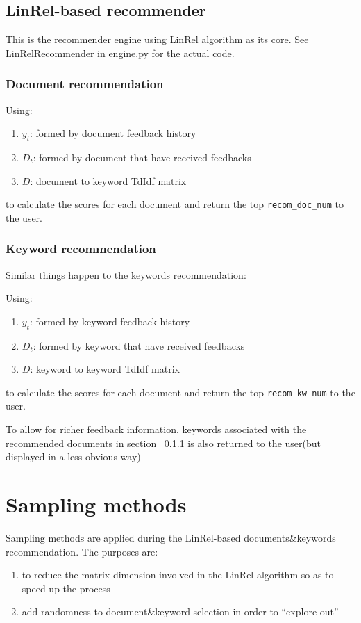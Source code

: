 \documentclass[10pt,a4paper]{article}
\begin{document}
\subsection{LinRel-based recommender}

This is the recommender engine using LinRel algorithm as its core. See LinRelRecommender in engine.py for the actual code.

\subsubsection{Document recommendation}
\label{linrel-doc-recom}

Using:
\begin{enumerate}
\item $y_t$: formed by document feedback history
\item $D_t$: formed by document that have received feedbacks
\item $D$: document to keyword TdIdf matrix 
\end{enumerate}
to calculate the scores for each document and return the top \verb+recom_doc_num+ to the user.


\subsubsection{Keyword recommendation}

Similar things happen to the keywords recommendation:

Using:
\begin{enumerate}
\item $y_t$: formed by keyword feedback history
\item $D_t$: formed by keyword that have received feedbacks
\item $D$: keyword to keyword TdIdf matrix 
\end{enumerate}

to calculate the scores for each document and return the top \verb+recom_kw_num+ to the user.

To allow for richer feedback information, keywords associated with the recommended documents in section ~\ref{linrel-doc-recom} is also returned to the user(but displayed in a less obvious way)

\section{Sampling methods}
Sampling methods are applied during the LinRel-based documents\&keywords recommendation. The purposes are:
\begin{enumerate}
\item to reduce the matrix dimension involved in the LinRel algorithm so as to speed up the process
\item add randomness to document\&keyword selection in order to ``explore out''
\end{enumerate}
\end{document}
